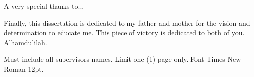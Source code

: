\begin{acknowledgement}
A very special thanks to...

Finally, this dissertation is dedicated to my father and mother for the vision and determination to educate me. This piece of victory is dedicated to both of you. Alhamdulilah.

Must include all supervisors names. Limit one (1) page only. Font Times New Roman 12pt.
\end{acknowledgement}

